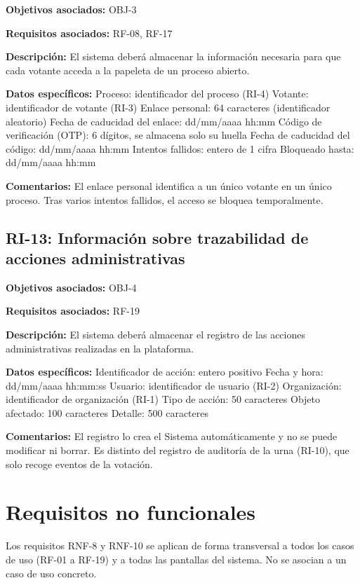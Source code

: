 \textbf{Objetivos asociados:} OBJ-3\par
\textbf{Requisitos asociados:} RF-08, RF-17\par
\textbf{Descripción:} El sistema deberá almacenar la información necesaria para que cada votante acceda a la papeleta de un proceso abierto.\par
\textbf{Datos específicos:} Proceso: identificador del proceso (RI-4) Votante: identificador de votante (RI-3) Enlace personal: 64 caracteres (identificador aleatorio) Fecha de caducidad del enlace: dd/mm/aaaa hh:mm Código de verificación (OTP): 6 dígitos, se almacena solo su huella Fecha de caducidad del código: dd/mm/aaaa hh:mm Intentos fallidos: entero de 1 cifra Bloqueado hasta: dd/mm/aaaa hh:mm\par
\textbf{Comentarios:} El enlace personal identifica a un único votante en un único proceso. Tras varios intentos fallidos, el acceso se bloquea temporalmente.\par

\subsection{RI-13: Información sobre trazabilidad de acciones administrativas}

\textbf{Objetivos asociados:} OBJ-4\par
\textbf{Requisitos asociados:} RF-19\par
\textbf{Descripción:} El sistema deberá almacenar el registro de las acciones administrativas realizadas en la plataforma.\par
\textbf{Datos específicos:} Identificador de acción: entero positivo Fecha y hora: dd/mm/aaaa hh:mm:ss Usuario: identificador de usuario (RI-2) Organización: identificador de organización (RI-1) Tipo de acción: 50 caracteres Objeto afectado: 100 caracteres Detalle: 500 caracteres\par
\textbf{Comentarios:} El registro lo crea el Sistema automáticamente y no se puede modificar ni borrar. Es distinto del registro de auditoría de la urna (RI-10), que solo recoge eventos de la votación.\par

\section{Requisitos no funcionales}
\label{sec:rnf-detallados}

Los requisitos RNF-8 y RNF-10 se aplican de forma transversal a todos los
casos de uso (RF-01 a RF-19) y a todas las pantallas del sistema. No se
asocian a un caso de uso concreto.

